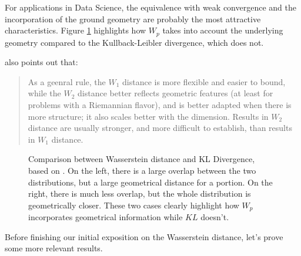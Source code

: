 For applications in Data Science, the equivalence with weak convergence and the
incorporation of the ground geometry are probably the most attractive characteristics.
Figure \ref{fig:wl-kl}
highlights how $W_p$ takes into account the underlying geometry compared
to the Kullback-Leibler divergence, which does not.

\citet{villani2008optimal} also points out that:
\begin{quote}
  As a geenral rule, the $W_1$ distance is more flexible and easier to bound,
  while the $W_2$ distance better reflects geometric features (at least for problems
  with a Riemannian flavor), and is better adapted when there is more structure; it also
  scales better with the dimension. Results in $W_2$ distance are usually stronger, and more
  difficult to establish, than results in $W_1$ distance.
\end{quote}


\begin{figure}[H]
  \centering
  \def\svgscale{0.7}
  
	\caption{Comparison between Wasserstein distance and KL Divergence, based on \citet{montavon2016boltzmann}.
  On the left,
  there is a large overlap between the two distributions, but a large geometrical distance for a portion. On the right,
  there is much less overlap, but the whole distribution is geometrically closer. These two
  cases clearly highlight how $W_p$ incorporates geometrical information while $KL$ doesn't.}
	\label{fig:wl-kl}
\end{figure}

Before finishing our initial exposition on the Wasserstein distance, let's prove some more relevant results.

